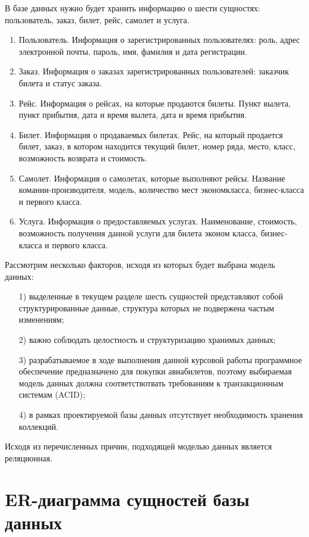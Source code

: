 \documentclass{bmstu}
\begin{document}
В базе данных нужно будет хранить информацию о шести сущностях: пользователь, заказ, билет, рейс, самолет и услуга.
\begin{enumerate}
\item Пользователь. 
Информация о зарегистрированных пользователях: роль, адрес электронной почты, пароль, имя, фамилия и дата регистрации.
\item Заказ. 
Информация о заказах зарегистрированных пользователей: заказчик билета и статус заказа.
\item Рейс. 
Информация о рейсах, на которые продаются билеты. 
Пункт вылета, пункт прибытия, дата и время вылета, дата и время прибытия.
\item Билет.
Информация о продаваемых билетах. 
Рейс, на который продается билет, заказ, в котором находится текущий билет, номер ряда, место, класс, возможность возврата и стоимость. 
\item Самолет. 
Информация о самолетах, которые выполняют рейсы. 
Название комании-производителя, модель, количество мест экономкласса, бизнес-класса и первого класса.
\item Услуга. 
Информация о предоставляемых услугах. 
Наименование, стоимость, возможность получения данной услуги для билета эконом класса, бизнес-класса и первого класса.
\end{enumerate}

Рассмотрим несколько факторов, исходя из которых будет выбрана модель данных:

\begin{enumerate}
\item[1)] выделенные в текущем разделе шесть сущностей представляют собой структурированные данные, структура которых не подвержена частым изменениям;
\item[2)] важно соблюдать целостность и структуризацию хранимых данных;
\item[3)] разрабатываемое в ходе выполнения данной курсовой работы программное обеспечение предназначено для покупки авиабилетов, поэтому выбираемая модель данных должна соответствотвать требованиям к транзакционным системам (ACID);
\item[4)] в рамках проектируемой базы данных отсутствует необходимость хранения коллекций.
\end{enumerate}
 
Исходя из перечисленных причин, подходящей моделью данных является реляционная.

\pagebreak
\section{ER-диаграмма сущностей базы данных}
\end{document}
